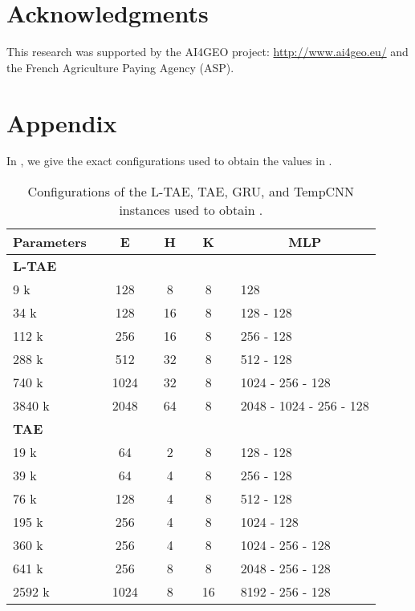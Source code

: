 \documentclass[runningheads]{llncs}
\begin{document}
\section*{Acknowledgments}
This research was supported by the AI4GEO project: \url{http://www.ai4geo.eu/} and the French Agriculture Paying Agency (ASP).



\section*{Appendix}


In , we give the exact configurations used to obtain the values in .
\begin{table}[]
\caption{Configurations of the L-TAE, TAE, GRU, and TempCNN instances used to obtain .}
\label{tab:all_config}
\label{tab:details1}
\centering
\begin{tabular}{lcccccccl}
Parameters &\phantom{ab}& E    &\phantom{ab}& H &\phantom{ab} & K &\phantom{ab}& \multicolumn{1}{c}{MLP}   \\ \toprule
\textbf{L-TAE} & & & & \\\hline
9 k        && 128  && 8  && 8 && 128                        \\
34 k        && 128  && 16 && 8 && 128 -  128                 \\
112 k       && 256  && 16 && 8 && 256 -  128                 \\
288 k       && 512  && 32 && 8 && 512 -  128                 \\
740 k       && 1024 && 32 && 8 && 1024 -  256 -  128         \\
3840 k    && 2048 && 64 && 8 && 2048 -  1024 -  256 -  128 \\\hline
\textbf{TAE} &\\\hline
19 k       && 64  && 2 && 8  && 128 -  128              \\
39 k       && 64  && 4 && 8  && 256 -  128              \\
76 k      && 128  && 4 && 8  && 512 -  128              \\
195 k      && 256  && 4 && 8  && 1024 -  128             \\
360 k      && 256  && 4 && 8  && 1024 -  256 -  128      \\
641 k      && 256  && 8 && 8  && 2048 -  256 -  128      \\
2592 k   && 1024 && 8 && 16 && 8192 -  256 -  128      
\\\bottomrule

\end{tabular}
\end{table}
\end{document}
